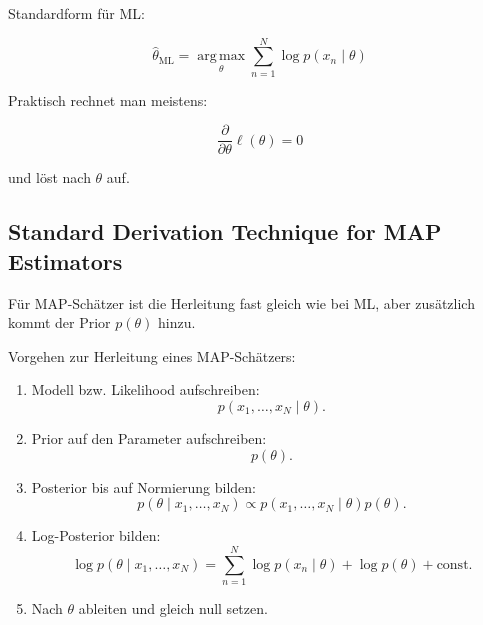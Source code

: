 \documentclass[11pt,a4paper]{scrartcl}
\begin{document}
\begin{answerbox}
    Standardform für ML:

    \[
        \boxed{
            \hat\theta_{\mathrm{ML}}
            =
            \operatorname*{arg\,max}_{\theta}
            \sum_{n=1}^{N}
            \log p(x_n \mid \theta)
        }
    \]

    Praktisch rechnet man meistens:

    \[
        \boxed{
            \frac{\partial}{\partial \theta}
            \ell(\theta)
            =
            0
        }
    \]

    und löst nach \(\theta\) auf.
\end{answerbox}

\subsection{Standard Derivation Technique for MAP Estimators}

\begin{notebox}
    Für MAP-Schätzer ist die Herleitung fast gleich wie bei ML, aber zusätzlich
    kommt der Prior \(p(\theta)\) hinzu.
\end{notebox}

\begin{calculationbox}
    Vorgehen zur Herleitung eines MAP-Schätzers:

    \begin{enumerate}
        \item Modell bzw. Likelihood aufschreiben:
        \[
            p(x_1,\dots,x_N \mid \theta).
        \]

        \item Prior auf den Parameter aufschreiben:
        \[
            p(\theta).
        \]

        \item Posterior bis auf Normierung bilden:
        \[
            p(\theta \mid x_1,\dots,x_N)
            \propto
            p(x_1,\dots,x_N \mid \theta)p(\theta).
        \]

        \item Log-Posterior bilden:
        \[
            \log p(\theta \mid x_1,\dots,x_N)
            =
            \sum_{n=1}^{N}
            \log p(x_n \mid \theta)
            +
            \log p(\theta)
            +
            \text{const}.
        \]

        \item Nach \(\theta\) ableiten und gleich null setzen.
    \end{enumerate}
\end{calculationbox}
\end{document}
